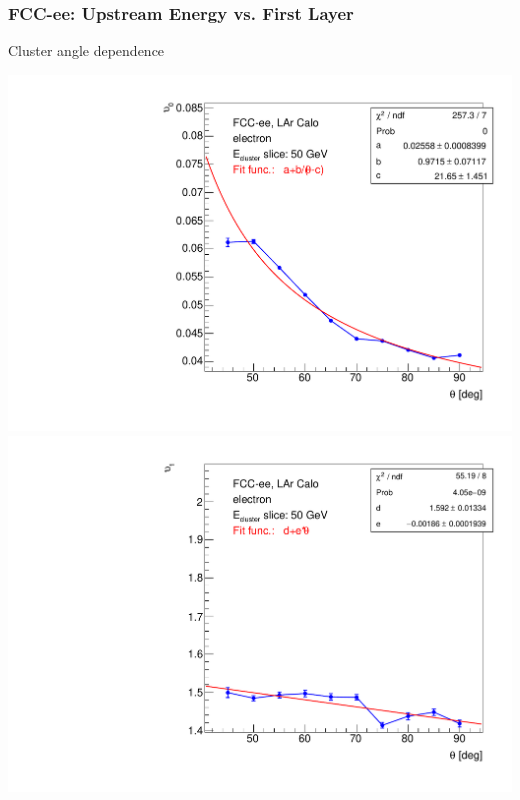 \documentclass[aspectratio=169]{beamer}
\newcommand{\redtext}[1]{%
  \textcolor{myRed}{#1}
}
\begin{document}
\begin{frame}
  \frametitle{FCC-ee: Upstream Energy vs. First Layer}

  \centering
  \redtext{Cluster angle dependence} \\[1.5ex]
  \begin{adjustwidth}{-5mm}{-5mm}
    \includegraphics[width=0.49\linewidth]{figures/2d/graph_upstream_theta_upsilon_0.pdf}
    \includegraphics[width=0.49\linewidth]{figures/2d/graph_upstream_theta_upsilon_1.pdf}\\[-3ex]
  \end{adjustwidth}
\end{frame}
\end{document}
